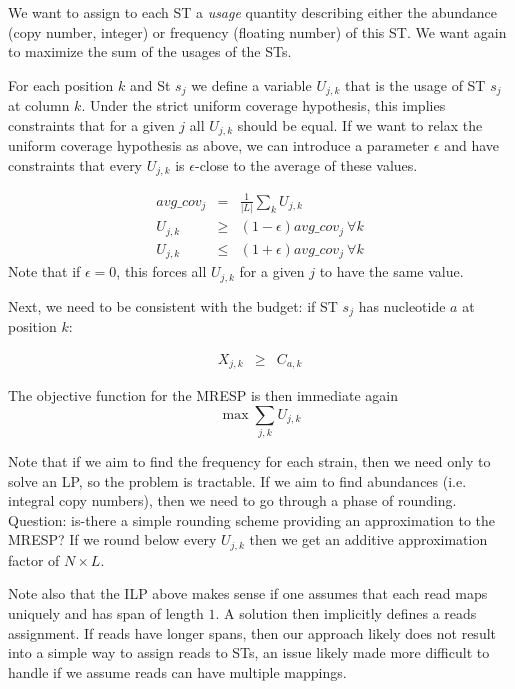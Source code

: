 \documentclass[10pt]{llncs}
\begin{document}
We want to assign to each ST a \textit{usage} quantity describing either the abundance (copy number, integer) or frequency (floating number) of this ST. We want again to maximize the sum of the usages of the STs. 

For each position $k$ and St $s_j$ we define a variable $U_{j,k}$ that is the usage of ST $s_j$ at column $k$. Under the strict uniform coverage hypothesis, this implies constraints that for a given $j$ all $U_{j,k}$ should be equal. If we want to relax the uniform coverage hypothesis as above, we can introduce a parameter $\epsilon$ and have constraints that every $U_{j,k}$ is $\epsilon$-close to the average of these values.

\begin{eqnarray}
    \label{eq:uniform_coverage_alt}
    avg\_cov_j & =   & \frac{1}{|L|} \sum_{k} U_{j,k} \\
    U_{j,k}  &\geq & (1-\epsilon) avg\_cov_j\  \forall k \\
    U_{j,k}  &\leq & (1+\epsilon) avg\_cov_j\  \forall k
\end{eqnarray}
Note that if $\epsilon=0$, this forces all $U_{j,k}$ for a given $j$ to have the same value.

Next, we need to be consistent with the budget: if ST $s_j$ has nucleotide $a$ at position $k$:

\begin{eqnarray}
    \label{eq:budget2}
    X_{j,k}  &\geq & C_{a,k}
\end{eqnarray}

The objective function for the MRESP is then immediate again
\begin{equation}
    \label{eq:obj_MRESP_alt}
    \max \sum_{j,k} U_{j,k}
\end{equation}

Note that if we aim to find the frequency for each strain, then we need only to solve an LP, so the problem is tractable. If we aim to find abundances (i.e. integral copy numbers), then we need to go through a phase of rounding. 
Question: is-there a simple rounding scheme providing an approximation to the MRESP? If we round below every $U_{j,k}$ then we get an additive approximation factor of $N\times L$.

Note also that the ILP above makes sense if one assumes that each read maps uniquely and has span of length $1$. A solution then implicitly defines a reads assignment. If reads have longer spans, then our approach likely does not result into a simple way to assign reads to STs, an issue likely made more difficult to handle if we assume reads can have multiple mappings.



\end{document}
